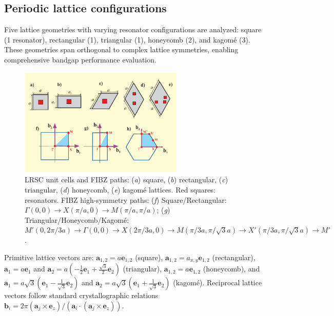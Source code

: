 \documentclass[review,numbers,sort&compress]{elsarticle}
\begin{document}
\subsection{Periodic lattice configurations}\label{lattice_configurations}

Five lattice geometries with varying resonator configurations are analyzed: square (1 resonator), rectangular (1), triangular (1), honeycomb (2), and kagomé (3). These geometries span orthogonal to complex lattice symmetries, enabling comprehensive bandgap performance evaluation.
\newpage
\begin{figure}[htb]
	\centering
	\includegraphics[width=0.7\textwidth]{ilustr_unit_cell_type_lattice.pdf}
\caption{LRSC unit cells and FIBZ paths: (\textit{a}) square, (\textit{b}) rectangular, (\textit{c}) triangular, (\textit{d}) honeycomb, (\textit{e}) kagomé lattices. Red squares: resonators. FIBZ high-symmetry paths: (\textit{f}) Square/Rectangular: $\Gamma(0,0) \to X(\pi/a,0) \to M(\pi/a,\pi/a)$; (\textit{g}) Triangular/Honeycomb/Kagomé: $M'(0,2\pi/3a) \to \Gamma(0,0) \to X(2\pi/3a,0) \to M(\pi/3a,\pi/\sqrt{3}a) \to X'(\pi/3a,\pi/\sqrt{3}a) \to M'$.}
	\label{ilustr_unit_cell_type_lattice}
\end{figure}

Primitive lattice vectors are: $\mathbf{a}_{1,2} = a\mathbf{e}_{1,2}$ (square), $\mathbf{a}_{1,2} = a_{x,y}\mathbf{e}_{1,2}$ (rectangular), $\mathbf{a}_1 = a\mathbf{e}_1$ and $\mathbf{a}_2 = a(-\frac{1}{2}\mathbf{e}_1 + \frac{\sqrt{3}}{2}\mathbf{e}_2)$ (triangular), $\mathbf{a}_{1,2} = a\mathbf{e}_{1,2}$ (honeycomb), and $\mathbf{a}_1 = a\sqrt{3}(\mathbf{e}_1 - \frac{1}{\sqrt{3}}\mathbf{e}_2)$ and $\mathbf{a}_2 = a\sqrt{3}(\mathbf{e}_1 + \frac{1}{\sqrt{3}}\mathbf{e}_2)$ (kagomé). Reciprocal lattice vectors follow standard crystallographic relations $\mathbf{b}_i = 2\pi(\mathbf{a}_j \times \mathbf{e}_z)/(\mathbf{a}_i \cdot (\mathbf{a}_j \times \mathbf{e}_z))$.
\end{document}
